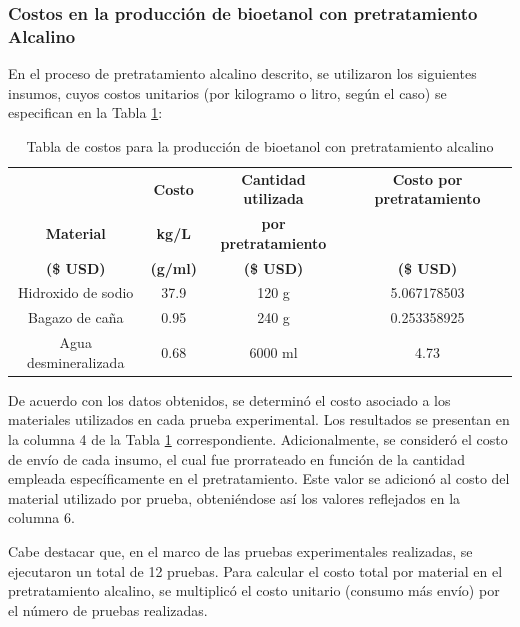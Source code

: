 \documentclass[12pt]{article}
\begin{document}
			\subsubsection{Costos en la producción de bioetanol con pretratamiento Alcalino}
			
En el proceso de pretratamiento alcalino descrito, se utilizaron los siguientes insumos, cuyos costos unitarios (por kilogramo o litro, según el caso) se especifican en la Tabla \ref{Costo para pretratamiento alcalino}:


			
				\begin{table}[H]
				
				\caption{Tabla de costos para la producción de bioetanol con pretratamiento alcalino}
				\label{Costo para pretratamiento alcalino}
					
					\begin{tabular}{|c|c|c|c|}
						\hline
									& \textbf{Costo}& \textbf{Cantidad utilizada }  & \textbf{ Costo por pretratamiento} \\
				   	\textbf{Material}&	\textbf{kg/L} & 	\textbf{por pretratamiento}& \\ 
						\textbf{(\$ USD) }		& \textbf{(g/ml)} &\textbf{	(\$ USD) }& \textbf{	(\$ USD) }\\ \hline		
						Hidroxido de sodio&37.9& 120 g&5.067178503 \\ \hline
						Bagazo de caña 	  &0.95& 240 g &  0.253358925 \\ \hline
						Agua desmineralizada&0.68& 6000 ml  &4.73 \\ \hline
				\end{tabular} 
		
				
			\end{table}
     De acuerdo con los datos obtenidos, se determinó el costo asociado a los materiales utilizados en cada prueba experimental. Los resultados se presentan en la columna 4 de la Tabla \ref{Costo para pretratamiento alcalino} correspondiente. Adicionalmente, se consideró el costo de envío de cada insumo, el cual fue prorrateado en función de la cantidad empleada específicamente en el pretratamiento. Este valor se adicionó al costo del material utilizado por prueba, obteniéndose así los valores reflejados en la columna 6.

     Cabe destacar que, en el marco de las pruebas experimentales realizadas, se ejecutaron un total de 12 pruebas. Para calcular el costo total por material en el pretratamiento alcalino, se multiplicó el costo unitario (consumo más envío) por el número de pruebas realizadas.
\end{document}
